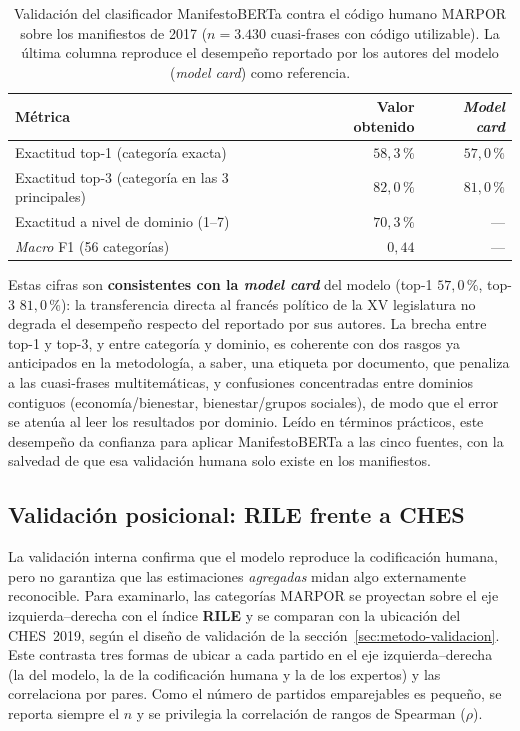 \begin{table}[H]
\centering
\caption{Validación del clasificador ManifestoBERTa contra el código humano
MARPOR sobre los manifiestos de 2017
($n = 3.430$ cuasi-frases con código utilizable). La última columna reproduce el
desempeño reportado por los autores del modelo (\emph{model card}) como
referencia.}
\label{tab:val-clasificador}
\begin{tabular}{@{}l r r@{}}
\toprule
\textbf{Métrica} & \textbf{Valor obtenido} & \textbf{\emph{Model card}} \\
\midrule
Exactitud top-1 (categoría exacta) & $58{,}3\,\%$ & $57{,}0\,\%$ \\
Exactitud top-3 (categoría en las 3 principales) & $82{,}0\,\%$ & $81{,}0\,\%$ \\
Exactitud a nivel de dominio (1--7) & $70{,}3\,\%$ & --- \\
\emph{Macro} F1 (56 categorías) & $0{,}44$ & --- \\
\bottomrule
\end{tabular}
\end{table}

Estas cifras son \textbf{consistentes con la \emph{model card}} del modelo
(top-1 $57{,}0\,\%$, top-3 $81{,}0\,\%$): la transferencia directa al francés
político de la XV legislatura no degrada el desempeño respecto del reportado por
sus autores. La brecha entre top-1 y top-3, y entre categoría y dominio, es
coherente con dos rasgos ya anticipados en la metodología, a saber, una etiqueta por
documento, que penaliza a las cuasi-frases multitemáticas, y confusiones
concentradas entre dominios contiguos (economía/bienestar, bienestar/grupos
sociales), de modo que el error se atenúa al leer los resultados por dominio.
Leído en términos prácticos, este desempeño da confianza para aplicar
ManifestoBERTa a las cinco fuentes, con la salvedad de que esa validación humana
solo existe en los manifiestos.

\subsection{Validación posicional: RILE frente a CHES}
\label{sec:res-val-ches}

La validación interna confirma que el modelo reproduce la codificación humana,
pero no garantiza que las estimaciones \emph{agregadas} midan algo externamente
reconocible. Para examinarlo, las categorías MARPOR se proyectan sobre el eje
izquierda--derecha con el índice \textbf{RILE} \cite{laver1992party} y se
comparan con la ubicación del CHES~2019, según el diseño de validación de la
sección~\ref{sec:metodo-validacion}. Este contrasta tres formas de ubicar a cada
partido en el eje izquierda--derecha (la del modelo, la de la codificación humana
y la de los expertos) y las correlaciona por pares. Como el número de partidos
emparejables es pequeño, se reporta siempre el $n$ y se privilegia la correlación
de rangos de Spearman ($\rho$).

